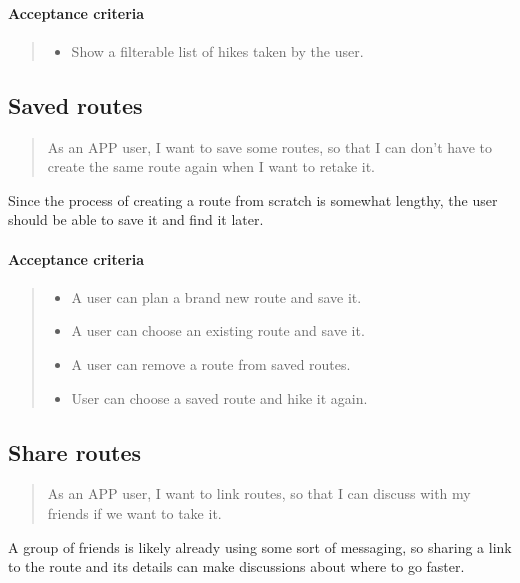 \paragraph*{Acceptance criteria}
\begin{quote}
\begin{itemize}
    \item Show a filterable list of hikes taken by the user.
\end{itemize}
\end{quote}

\subsection{Saved routes}\label{US:map-saved}
\begin{quote}
As an APP user, I want to save some routes, so that I can don't have to create the same route again when I want to retake it.
\end{quote}

Since the process of creating a route from scratch is somewhat lengthy, the user should be able to save it and find it later.

\paragraph*{Acceptance criteria}
\begin{quote}
\begin{itemize}
    \item A user can plan a brand new route and save it.
    \item A user can choose an existing route and save it.
    \item A user can remove a route from saved routes.
    \item User can choose a saved route and hike it again.
\end{itemize}
\end{quote}

\subsection{Share routes}\label{US:map-share-route}
\begin{quote}
    As an APP user, I want to link routes, so that I can discuss with my friends if we want to take it.
\end{quote}

A group of friends is likely already using some sort of messaging, so sharing a link to the route and its details can make discussions about where to go faster.

